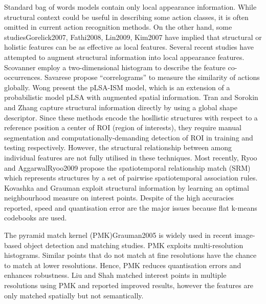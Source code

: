 Standard bag of words models contain only local appearance information. While structural context could be useful in describing some action classes, it is often omitted in current action recognition methods.
On the other hand, some studies{Gorelick2007, Fathi2008, Lin2009, Kim2007} have implied that structural or holistic features can be as effective as local features.
Several recent studies have attempted to augment structural information into local appearance features. Scovanner \etal \cite{Scovanner2007} employ a two-dimensional histogram to describe the feature co-occurrences. Savarese \etal \cite{Savarese2008} propose ``correlograms'' to measure the similarity of actions globally. Wong \etal \cite{Wong2007} present the pLSA-ISM model, which is an extension of a probabilistic model pLSA with augmented spatial information. 
Tran and Sorokin \cite{Tran2008} and Zhang \etal \cite{Zhang2008} capture structural information directly by using a global shape descriptor.
Since these methods \cite{Wong2007,Tran2008, Zhang2008} encode the hosllistic structures with respect to a reference position \eg a center of ROI (region of interests), they require manual segmentation and computationally-demanding detection of ROI in training and testing respectively. 
However, the structural relationship between among individual features are not fully utilised in these techniques.
Most recently, Ryoo and Aggarwal{Ryoo2009} propose the spatiotemporal relationship match (SRM) which represents structures by a set of pairwise spatiotemporal association rules. Kovashka and Grauman \cite{Kovashka2010} exploit structural information by learning an optimal neighbourhood measure on interest points. Despite of the high accuracies reported, speed and quantisation error are the major issues because flat k-means codebooks are used.

The pyramid match kernel (PMK){Grauman2005} is widely used in recent image-based object detection and matching studies. PMK exploits multi-resolution histograms. Similar points that do not match at fine resolutions have the chance to match at lower resolutions. Hence, PMK reduces quantisation errors and enhances robustness. Liu and Shah \cite{Liu2008} matched interest points in multiple resolutions using PMK and reported improved results, however the features are only matched spatially but not semantically.


